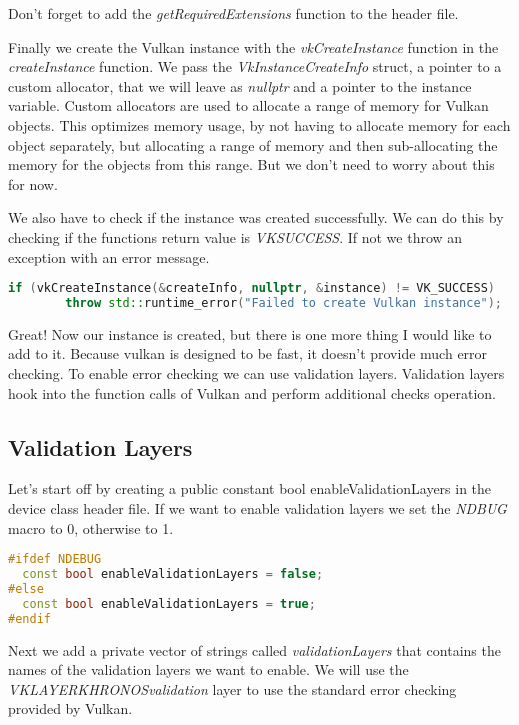 \documentclass[12pt]{report} \usepackage{preamble}
\begin{document}
Don't forget to add the \textit{getRequiredExtensions} function to the header file.

Finally we create the Vulkan instance with the \textit{vkCreateInstance} function in the
\textit{createInstance} function. We pass the \textit{VkInstanceCreateInfo} struct, a pointer to
a custom allocator, that we will leave as \textit{nullptr} and a pointer to the instance variable.
Custom allocators are used to allocate a range of memory for Vulkan objects. This optimizes memory usage, by
not having to allocate memory for each object separately, but allocating a range of memory and then
sub-allocating the memory for the objects from this range. But we don't need to worry about this for now.

We also have to check if the instance was created successfully. We can do this by checking if the
functions return value is \textit{VK\textunderscore SUCCESS}. If not we throw an exception with an error message.

\begin{lstlisting}[language=C++]
if (vkCreateInstance(&createInfo, nullptr, &instance) != VK_SUCCESS) 
		throw std::runtime_error("Failed to create Vulkan instance");
\end{lstlisting}

Great! Now our instance is created, but there is one more thing I would like to
add to it. Because vulkan is designed to be fast, it doesn't
provide much error checking. To enable error checking we can use validation layers.
Validation layers hook into the function calls of Vulkan and perform additional checks
operation.

\subsection{Validation Layers}

Let's start off by creating a public constant bool enableValidationLayers in the device class header file.
If we want to enable validation layers we set the \textit{NDBUG} macro to 0, otherwise to 1.

\begin{lstlisting}[language=C++]
#ifdef NDEBUG
  const bool enableValidationLayers = false;
#else
  const bool enableValidationLayers = true;
#endif
\end{lstlisting}

Next we add a private vector of strings called \textit{validationLayers} that contains the names of the
validation layers we want to enable.
We will use the \textit{VK\textunderscore LAYER\textunderscore KHRONOS\textunderscore validation}
layer to use the standard error checking provided by Vulkan.
\end{document}
